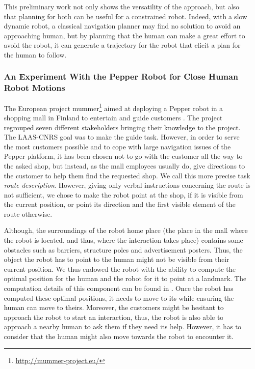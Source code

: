 \documentclass[a4paper,11pt,twoside]{StyleThese}
\begin{document}
This preliminary work not only shows the versatility of the approach, but also that planning for both can be useful for a constrained robot. Indeed, with a slow dynamic robot, a classical navigation planner may find no solution to avoid an approaching human, but by planning that the human can make a great effort to avoid the robot, it can generate a trajectory for the robot that elicit a plan for the human to follow.

\subsubsection{An Experiment With the Pepper Robot for Close Human Robot Motions}
The European project \acrshort{mummer}\footnote{\url{http://mummer-project.eu/}} aimed at deploying a Pepper robot in a shopping mall in Finland to entertain and guide customers \cite{foster2019mummer}. The project regrouped seven different stakeholders bringing their knowledge to the project. The LAAS-CNRS goal was to make the guide task. However, in order to serve the most customers possible and to cope with large navigation issues of the Pepper platform, it has been chosen not to go with the customer all the way to the asked shop, but instead, as the mall employees usually do, give directions to the customer to help them find the requested shop. We call this more precise task \textit{route description}.
However, giving only verbal instructions concerning the route is not sufficient, we chose to make the robot point at the shop, if it is visible from the current position, or point its direction and the first visible element of the route otherwise.

Although, the surroundings of the robot home place (the place in the mall where the robot is located, and thus, where the interaction takes place) contains some obstacles such as barriers, structure poles and advertisement posters. Thus, the object the robot has to point to the human might not be visible from their current position. We thus endowed the robot with the ability to compute the optimal position for the human and the robot for it to point at a landmark. The computation details of this component can be found in \cite{waldhart_reasoning_shared_2019}. Once the robot has computed these optimal positions, it needs to move to its while ensuring the human can move to theirs. Moreover, the customers might be hesitant to approach the robot to start an interaction, thus, the robot is also able to approach a nearby human to ask them if they need its help. However, it has to consider that the human might also move towards the robot to encounter it.
\end{document}
